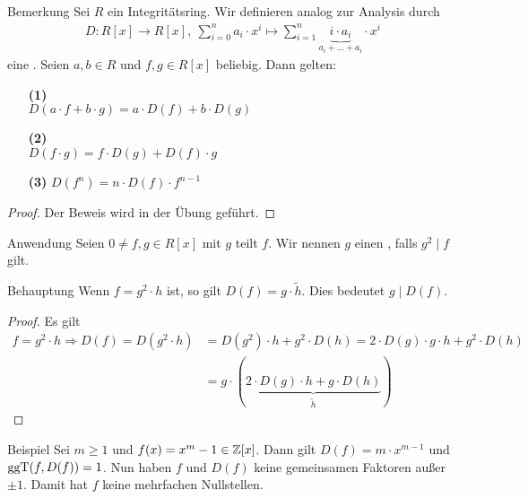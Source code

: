 \begin{genericdf}{Bemerkung} \label{skirpt:7.8}
	Sei $R$ ein Integritätsring.
	Wir definieren analog zur Analysis durch
	\begin{align*}
	D: R[x] \to R[x], 
	\ \sum \limits_{i=0}^n a_i \cdot x^i \mapsto \sum \limits_{i=1}^n \underbrace{i \cdot a_i}_{a_i+ \dots +a_i} \cdot x^i
	\end{align*}		
	eine .
	Seien $a,b \in R$ und $f,g \in R[x]$ beliebig.
	Dann gelten:
	\begin{enumerate}
		\item[\textbf{(1)}] \\
		$D(a\cdot f + b\cdot g) = a \cdot D(f) + b \cdot D(g)$
		
		\item[\textbf{(2)}] \\
		$D(f\cdot g) = f \cdot D(g) + D(f) \cdot g$
		
		\item[\textbf{(3)}]
		$D(f^n) = n \cdot D(f) \cdot f^{n-1}$
	\end{enumerate}
\end{genericdf}

\begin{proof}
	Der Beweis wird in der Übung geführt.
\end{proof}

\begin{generic_no_num}{Anwendung}
	Seien $0 \neq f,g \in R[x]$ mit $g$ teilt $f$.
	Wir nennen $g$ einen , falls $g^2 \mid f$ gilt.
\end{generic_no_num}

\begin{genericthm_no_num}{Behauptung}
	Wenn $f = g^2 \cdot h$ ist, so gilt $D(f) = g \cdot \tilde{h}$.
	Dies bedeutet $g \mid D(f)$.
\end{genericthm_no_num}

\begin{proof}
	Es gilt
	\begin{align*}
	f = g^2 \cdot h
	\Rightarrow 
	D(f) = D(g^2 \cdot h) &= D(g^2) \cdot h + g^2 \cdot D(h)
	= 2 \cdot D(g) \cdot g\cdot h + g^2 \cdot D(h)\\
	&= g \cdot (\underbrace{2 \cdot D(g) \cdot h + g \cdot D(h)}_{\tilde{h}})
	\end{align*}
\end{proof}

\begin{generic_no_num}{Beispiel}
	Sei $m \geq 1$ und $f(x) = x^m - 1 \in \mathbb{Z}[x]$.
	Dann gilt $D(f) = m \cdot x^{m-1}$ und $\operatorname{ggT}(f,D(f)) = 1$.
	Nun haben $f$ und $D(f)$ keine gemeinsamen Faktoren außer $\pm 1$.
	Damit hat $f$ keine mehrfachen Nullstellen.
\end{generic_no_num}

